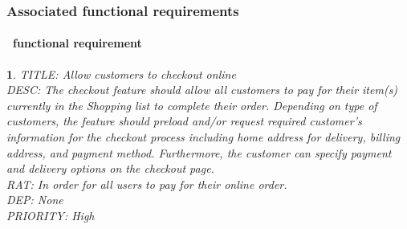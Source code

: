\documentclass{scrreprt}
\theoremstyle{funreq}
\newtheorem{funreq}{}
\begin{document}
\subsubsection{Associated functional requirements}
	
	
	\paragraph[]{\Subsectionname ~functional requirement }
	\begin{funreq}
		\label{online_checkout}
		TITLE: Allow customers to checkout online\\
		DESC: The checkout feature should allow all customers to pay for their item(s) currently in the Shopping list to complete their order. Depending on type of customers, the feature should preload and/or request required customer’s information for the checkout process including home address for delivery, billing address, and payment method. Furthermore, the customer can specify payment and delivery options on the checkout page.\\
		RAT: In order for all users to pay for their online order.\\
		DEP: None\\
		PRIORITY: High\\
		\end{funreq}
	
\end{document}
